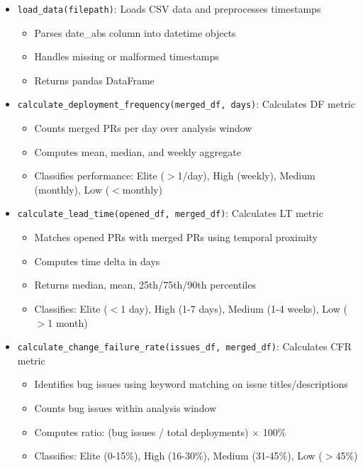 \begin{itemize}
  \item \texttt{load\_data(filepath)}: Loads CSV data and
    preprocesses timestamps
    \begin{itemize}
      \item Parses date\_abs column into datetime objects
      \item Handles missing or malformed timestamps
      \item Returns pandas DataFrame
    \end{itemize}

  \item \texttt{calculate\_deployment\_frequency(merged\_df, days)}:
    Calculates DF metric
    \begin{itemize}
      \item Counts merged PRs per day over analysis window
      \item Computes mean, median, and weekly aggregate
      \item Classifies performance: Elite ($>$1/day), High (weekly),
        Medium (monthly), Low ($<$monthly)
    \end{itemize}

  \item \texttt{calculate\_lead\_time(opened\_df, merged\_df)}:
    Calculates LT metric
    \begin{itemize}
      \item Matches opened PRs with merged PRs using temporal proximity
      \item Computes time delta in days
      \item Returns median, mean, 25th/75th/90th percentiles
      \item Classifies: Elite ($<$1 day), High (1-7 days), Medium
        (1-4 weeks), Low ($>$1 month)
    \end{itemize}

  \item \texttt{calculate\_change\_failure\_rate(issues\_df,
    merged\_df)}: Calculates CFR metric
    \begin{itemize}
      \item Identifies bug issues using keyword matching on issue
        titles/descriptions
      \item Counts bug issues within analysis window
      \item Computes ratio: (bug issues / total deployments) $\times$ 100\%
      \item Classifies: Elite (0-15\%), High (16-30\%), Medium
        (31-45\%), Low ($>$45\%)
    \end{itemize}


\end{itemize}
